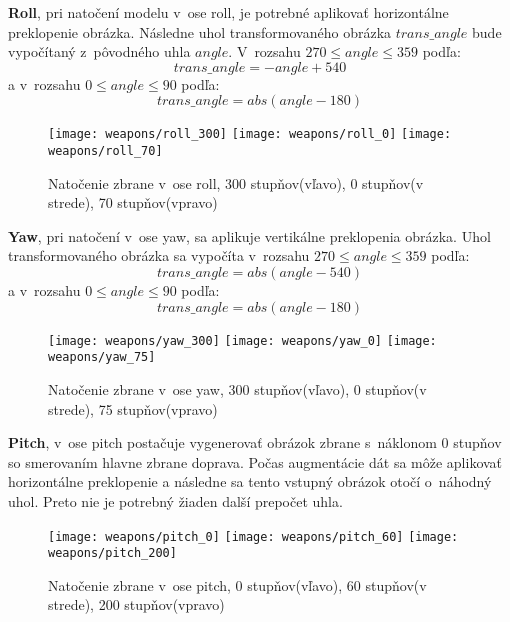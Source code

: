 \textbf{Roll}, pri natočení modelu v~ose roll, je potrebné aplikovať horizontálne preklopenie obrázka.
Následne uhol transformovaného obrázka $trans\_angle$ bude vypočítaný z~pôvodného uhla $angle$.
V~rozsahu $270 \leq angle \leq 359$ podľa:
\begin{equation}
    trans\_angle = -angle + 540 
\end{equation}
a v~rozsahu $0 \leq angle \leq 90$ podľa:
\begin{equation}
    trans\_angle = abs(angle - 180)
\end{equation}

\begin{figure}[H]
    \centering
    \texttt{[image: weapons/roll\_300]}
    \quad
    \texttt{[image: weapons/roll\_0]}
    \quad
    \texttt{[image: weapons/roll\_70]}
    \caption{Natočenie zbrane v~ose roll, 300 stupňov(vľavo), 0 stupňov(v strede), 70 stupňov(vpravo)}
    \label{pic:rollrotation}
\end{figure}

\textbf{Yaw}, pri natočení v~ose yaw, sa aplikuje vertikálne preklopenia obrázka.
Uhol transformovaného obrázka sa vypočíta v~rozsahu $270 \leq angle \leq 359$ podľa:
\begin{equation}
    trans\_angle = abs(angle - 540)
\end{equation}
a v~rozsahu $0 \leq angle \leq 90$ podľa:
\begin{equation}
    trans\_angle = abs(angle - 180)
\end{equation}

\begin{figure}[H]
    \centering
    \texttt{[image: weapons/yaw\_300]}
    \quad
    \texttt{[image: weapons/yaw\_0]}
    \quad
    \texttt{[image: weapons/yaw\_75]}
    \caption{Natočenie zbrane v~ose yaw, 300 stupňov(vľavo), 0 stupňov(v strede), 75 stupňov(vpravo)}
    \label{pic:yawrotation}
\end{figure}

\textbf{Pitch}, v~ose pitch postačuje vygenerovať obrázok zbrane s~náklonom 0 stupňov so smerovaním hlavne zbrane doprava.
Počas augmentácie dát sa môže aplikovať horizontálne preklopenie a následne sa tento vstupný obrázok otočí o~náhodný uhol.
Preto nie je potrebný žiaden další prepočet uhla.

\begin{figure}[H]
    \centering
    \texttt{[image: weapons/pitch\_0]}
    \quad
    \texttt{[image: weapons/pitch\_60]}
    \quad
    \texttt{[image: weapons/pitch\_200]}
    \caption{Natočenie zbrane v~ose pitch, 0 stupňov(vľavo), 60 stupňov(v strede), 200 stupňov(vpravo)}
    \label{pic:yawrotation}
\end{figure}
